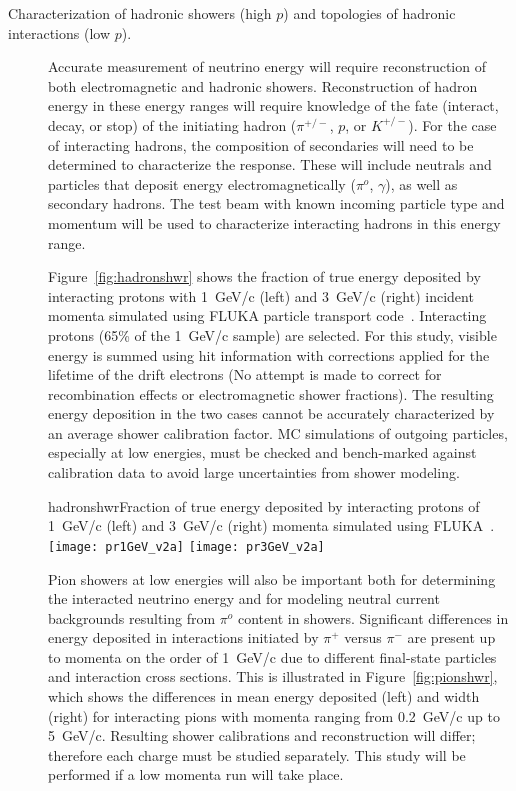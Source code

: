 \begin{description}
\item [Characterization of hadronic showers (high $p$) and topologies of hadronic interactions (low $p$).]


Accurate measurement of neutrino energy will require reconstruction of both electromagnetic and hadronic showers. Reconstruction of hadron energy 
in these energy ranges will require knowledge of the fate (interact, decay, or stop) of the initiating hadron ($\pi^{+/-}$, $p$, or $K^{+/-}$).
For the case of  interacting hadrons, the composition of secondaries
will need to be determined to characterize the response. 
These will include neutrals and particles that 
deposit energy electromagnetically ($\pi^o$, $\gamma$), as well as
secondary hadrons. The test beam with known incoming particle type and momentum will be used
to characterize interacting hadrons in this energy range.


Figure~\ref{fig:hadronshwr} shows the fraction of true energy deposited by interacting protons with 1~GeV/c (left) and
3~GeV/c (right) incident momenta simulated using FLUKA particle transport code~\cite{fluka05}. 
Interacting protons (65\% of the 1~GeV/c sample) are selected.
For this study, visible energy is summed using hit information with corrections applied for the lifetime of 
the drift electrons (No attempt is made to correct for recombination effects or electromagnetic shower fractions). 
The resulting energy deposition in the two cases cannot be 
accurately characterized by an average shower calibration factor. MC simulations of 
outgoing particles, especially at low energies, must be checked and bench-marked against calibration data to avoid
large uncertainties from shower modeling. 

\begin{cdrfigure}{hadronshwr}{Fraction of true energy deposited by interacting protons of 1~GeV/c (left) and
3~GeV/c (right) momenta simulated using FLUKA~\cite{fluka05}.}
\texttt{[image: pr1GeV\_v2a]}
\texttt{[image: pr3GeV\_v2a]}
\end{cdrfigure}


Pion showers at low energies will also be important both for determining the interacted neutrino energy and for modeling neutral current backgrounds resulting from $\pi^o$ content in showers. Significant
 differences in energy deposited in interactions initiated by $\pi^+$ versus $\pi^-$  are present up to momenta on the order of 1~GeV/c due to different
final-state particles and interaction cross sections. This is illustrated in 
Figure~\ref{fig:pionshwr}, which shows the differences in mean energy deposited (left) and width (right) 
for interacting pions with momenta ranging from 0.2~GeV/c up to 5~GeV/c.
Resulting shower calibrations and reconstruction will differ; therefore each charge must be 
studied separately. This study will be performed if a low momenta run will take place.  


\end{description}
